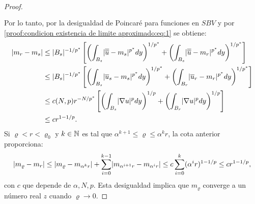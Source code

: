 \documentclass[a4paper,11pt,spanish, twoside, leqno]{tfm-uam}
\begin{document}
\begin{proof}
\begin{align*}
\begin{array}{ll}
\end{array}
\end{align*}
Por lo tanto, por la desigualdad de Poincaré para funciones en $SBV$ y por \ref{proof:condicion existencia de limite aproximado:eq:1} se obtiene:
\begin{align*}
\lvert m_{r}-m_{s}\rvert&\leq \lvert B_{s}\rvert^{-1/p^{*}}\left [ \left ( \int_{B_{s}}\lvert\overline{\overline{u}}-m_{s}\rvert^{p^{*}}dy \right )^{1/p^{*}}+\left ( \int_{B_{s}} \lvert\overline{\overline{u}}-m_{r}\rvert^{p^{*}}dy\right )^{1/p^{*}}  \right ]
\\&\leq  \lvert B_{s}\rvert^{-1/p^{*}} \left [\left ( \int_{B_{s}}\lvert\overline{u}_{s}-m_{s}\rvert^{p^{*}}dy\right )^{1/p^{*}}+\left ( \int_{B_{r}} \lvert\overline{u}_{r}-m_{r}\rvert^{p^{*}}dy\right )^{1/p^{*}}  \right ]
\\&\leq c(N,p)r^{-N/p^{*}}\left [ \left( \int_{B_{s}}\lvert\nabla{u}\rvert^{p}dy\right )^{1/p}+\left ( \int_{B_{r}}\lvert\nabla{u}\rvert^{p}dy\right)^{1/p}\right ]
\\&\leq cr^{1-1/p}.
\end{align*}
Si $\varrho<r<\varrho_{0}$ y $k\in \mathbb{N}$ es tal que $\alpha^{k+1}\leq \varrho\leq \alpha^{k}r$, la cota anterior proporciona:
\begin{align*}
\lvert m_{\varrho}-m_{r}\rvert\leq \lvert m_{\varrho}-m_{\alpha^{k}r}\rvert+\sum_{i=0}^{k-1}\lvert m_{\alpha^{i+1}r}-m_{\alpha^{i}r}\rvert\leq c\sum^{k}_{i=0}(\alpha^{i}r)^{1-1/p}\leq cr^{1-1/p},
\end{align*}
con $c$ que depende de $\alpha,N,p$. Esta desigualdad implica que $m_{\varrho}$ converge a un número real $z$ cuando $\varrho\to 0$.


\end{proof}
\end{document}
